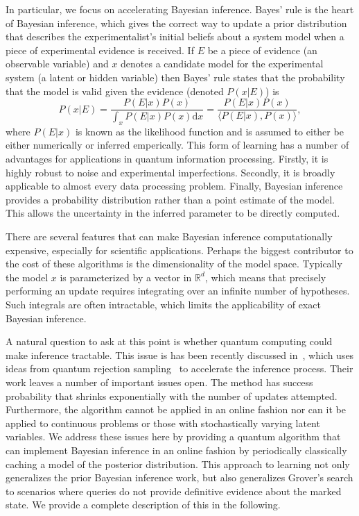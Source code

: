 \documentclass[aps,amsmath,onecolumn,amssymb]{revtex4}
\begin{document}
In particular, we focus on accelerating Bayesian inference.  Bayes' rule is the heart of Bayesian inference, which gives the correct way to update a prior distribution that describes the experimentalist's initial beliefs about a system model when a piece of experimental evidence is received.  If $E$ be a piece of evidence (an observable variable) and $x$ denotes a candidate model for the experimental system (a latent or hidden variable) then Bayes' rule states that the probability that the model is valid given the evidence (denoted $P(x|E)$) is 
\begin{equation}
P(x|E)= \frac{P(E|x) P(x)}{\int_x P(E|x) P(x)\mathrm{d}x}= \frac{P(E|x) P(x)}{\langle P(E|x), P(x) \rangle},\label{eq:Bayes}
\end{equation}
where $P(E|x)$ is known as the likelihood function and is assumed to either be either numerically or inferred emperically.
This form of learning has a number of advantages for applications in quantum information processing.  Firstly, it is highly robust to noise and experimental imperfections.  Secondly, it is broadly applicable to almost every data processing problem.  Finally, Bayesian inference provides a probability distribution rather than a point estimate of the model. This allows the uncertainty in the inferred parameter to be directly computed.



There are several features that can make Bayesian inference computationally expensive, especially for scientific applications.  Perhaps the biggest contributor to the cost of these algorithms is the dimensionality of the model space.  Typically the model $x$ is parameterized by a vector in $\mathbb{R}^d$, which means that precisely performing an update requires integrating over an infinite number of hypotheses.  Such integrals are often intractable, which limits the applicability of exact Bayesian inference.  %

A natural question to ask at this point is whether quantum computing could make inference tractable.  This issue is has been recently discussed in~\cite{LYC14}, which uses ideas from quantum rejection sampling~\cite{HHL09,ORR13} to accelerate the inference process.  Their work leaves a number of important issues open.  The method has success probability that shrinks exponentially with the number of updates attempted.  Furthermore, the algorithm cannot be applied in an online fashion nor can it be applied to continuous problems or those with stochastically varying latent variables.  We address these issues here by providing a quantum algorithm that can implement Bayesian inference in an online fashion by periodically classically caching a model of the posterior distribution.  This approach to learning not only generalizes the prior Bayesian inference work, but also generalizes Grover's search to scenarios where queries do not provide definitive evidence about the marked state.  We provide a complete description of this in the following.
\end{document}
